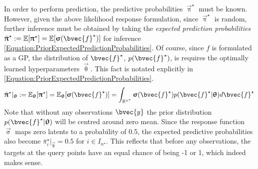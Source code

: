 				In order to perform prediction, the predictive probabilities $\vec{\uppi}^{\star}$ must be known. However, given the above likelihood response formulation, since $\vec{\uppi}^{\star}$ is random, further inference must be obtained by taking the \textit{expected prediction probabilities} $\bar{\vec{\uppi}}^{\star} := \mathbb{E}[\vec{\uppi}^{\star}] = \mathbb{E}[\vec{\upsigma}(\bvec{f}^{\star})]$ for inference \eqref{Equation:PriorExpectedPredictionProbabilities}. Of course, since $f$ is formulated as a GP, the distribution of $\bvec{f}^{\star}$, $p(\bvec{f}^{\star})$, is requires the optimally learned hyperparameters $\vec{\uptheta}$. This fact is notated explicitly in \eqref{Equation:PriorExpectedPredictionProbabilities}. \begin{equation}
					\bar{\vec{\uppi}}^{\star} |_{\vec{\uptheta}} := \mathbb{E}_{\vec{\uptheta}}[\vec{\uppi}^{\star}] = \mathbb{E}_{\vec{\uptheta}}[\vec{\upsigma}(\bvec{f}^{\star})] = \int_{\mathbb{R}^{n^{\star}}} \vec{\upsigma}(\bvec{f}^{\star}) p(\bvec{f}^{\star} | \vec{\uptheta}) d \bvec{f}^{\star}
				\label{Equation:PriorExpectedPredictionProbabilities}
				\end{equation} Note that without any observations $\bvec{y}$ the prior distribution $p(\bvec{f}^{\star} | \vec{\uptheta})$ will be centred around zero mean. Since the response function $\vec{\upsigma}$ maps zero latents to a probability of 0.5, the expected predictive probabilities also become $\bar{\pi}^{\star}_{i} |_{\vec{\uptheta}} = 0.5$ for $i \in I_{n^{\star}}$. This reflects that before any observations, the targets at the query points have an equal chance of being -1 or 1, which indeed makes sense.
				 
